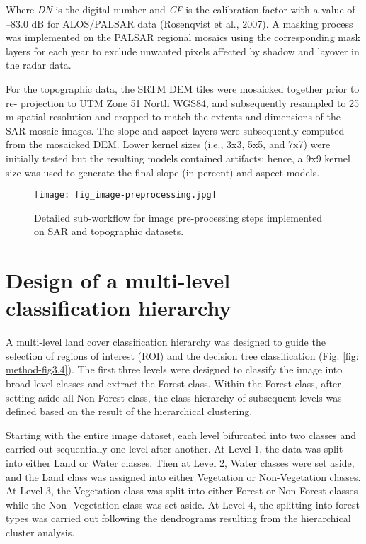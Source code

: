 \noindent Where \textit{DN} is the digital number and \textit{CF} is the calibration factor with a value of –83.0 dB for ALOS/PALSAR data (Rosenqvist et al., 2007). A masking process was implemented on the PALSAR regional mosaics using the corresponding mask layers for each year to exclude unwanted pixels affected by shadow and layover in the radar data.

For the topographic data, the SRTM DEM tiles were mosaicked together prior to re- projection to UTM Zone 51 North WGS84, and subsequently resampled to 25 m spatial resolution and cropped to match the extents and dimensions of the SAR mosaic images. The slope and aspect layers were subsequently computed from the mosaicked DEM. Lower kernel sizes (i.e., 3x3, 5x5, and 7x7) were initially tested but the resulting models contained artifacts; hence, a 9x9 kernel size was used to generate the final slope (in percent) and aspect models.

\begin{figure}
	\centering
	\texttt{[image: fig\_image-preprocessing.jpg]}
	\caption[Detailed sub-workflow for image pre-processing steps implemented on SAR and topographic datasets.]{Detailed sub-workflow for image pre-processing steps implemented on SAR and topographic datasets.}
	\label{fig: method-fig3.3}
\end{figure}

\section{Design of a multi-level classification hierarchy}
\label{sec: method-class-hierarchy}

A multi-level land cover classification hierarchy was designed to guide the selection of regions of interest (ROI) and the decision tree classification (Fig. \ref{fig: method-fig3.4}). The first three levels were designed to classify the image into broad-level classes and extract the Forest class. Within the Forest class, after setting aside all Non-Forest class, the class hierarchy of subsequent levels was defined based on the result of the hierarchical clustering.

Starting with the entire image dataset, each level bifurcated into two classes and carried out sequentially one level after another. At Level 1, the data was split into either Land or Water classes. Then at Level 2, Water classes were set aside, and the Land class was assigned into either Vegetation or Non-Vegetation classes. At Level 3, the Vegetation class was split into either Forest or Non-Forest classes while the Non- Vegetation class was set aside. At Level 4, the splitting into forest types was carried out following the dendrograms resulting from the hierarchical cluster analysis.

